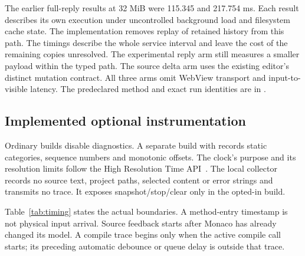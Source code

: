 The earlier full-reply results at 32 MiB were 115.345 and 217.754 ms.
Each result describes its own execution under uncontrolled background load
and filesystem cache state. The implementation removes replay of retained
history from this path. The timings describe the whole service interval and
leave the cost of the remaining copies unresolved. The experimental reply
arm still measures a smaller payload within the typed path. The source
delta arm uses the existing editor's distinct mutation contract. All three
arms omit WebView transport and input-to-visible latency. The predeclared
method and exact run identities are in
.

\subsection{Implemented optional instrumentation}
Ordinary builds disable diagnostics. A separate build with
 records static categories, sequence numbers
and monotonic  offsets. The clock's purpose and its
resolution limits follow the High Resolution Time API~\cite{hrtime}.
The local collector records no source text, project paths, selected content
or error strings and transmits no trace. It exposes snapshot/stop/clear only
in the opted-in build.

Table~\ref{tab:timing} states the actual boundaries. A method-entry timestamp
is not physical input arrival. Source feedback starts after Monaco has already
changed its model. A compile trace begins only when the active compile call
starts; its preceding automatic debounce or queue delay is outside that trace.

